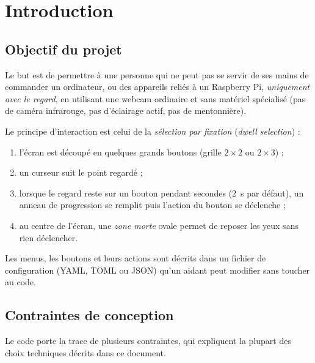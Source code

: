 \chapter{Introduction}
\label{chap:intro}

\section{Objectif du projet}

Le but est de permettre à une personne qui ne peut pas se servir de ses mains de commander un ordinateur, ou des appareils reliés à un Raspberry Pi, \emph{uniquement avec le regard}, en utilisant une webcam ordinaire et sans matériel spécialisé (pas de caméra infrarouge, pas d'éclairage actif, pas de mentonnière).

Le principe d'interaction est celui de la \emph{sélection par fixation} (\emph{dwell selection}) :
\begin{enumerate}
  \item l'écran est découpé en quelques grands boutons (grille $2\times2$ ou $2\times3$) ;
  \item un curseur suit le point regardé ;
  \item lorsque le regard reste sur un bouton pendant  secondes (\qty{2}{\second} par défaut), un anneau de progression se remplit puis l'action du bouton se déclenche ;
  \item au centre de l'écran, une \emph{zone morte} ovale permet de reposer les yeux sans rien déclencher.
\end{enumerate}

Les menus, les boutons et leurs actions sont décrits dans un fichier de configuration (YAML, TOML ou JSON) qu'un aidant peut modifier sans toucher au code.

\section{Contraintes de conception}

Le code porte la trace de plusieurs contraintes, qui expliquent la plupart des choix techniques décrits dans ce document.

